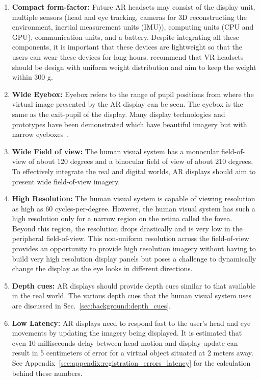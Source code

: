 \begin{enumerate}
    \item \textbf{Compact form-factor:} Future AR headsets may consist of the display unit, multiple sensors (head and eye tracking, cameras for 3D reconstructing the environment, inertial measurement units (IMU)), computing units (CPU and GPU), communication units, and a battery. Despite integrating all these components, it is important that these devices are lightweight so that the users can wear these devices for long hours. \cite{yan2018effects} recommend that VR headsets should be design with uniform weight distribution and aim to keep the weight within 300 g.
    \item \textbf{Wide Eyebox:} Eyebox refers to the range of pupil positions from where the virtual image presented by the AR display can be seen. The eyebox is the same as the exit-pupil of the display. Many display technologies and prototypes have been demonstrated which have beautiful imagery but with narrow eyeboxes~\cite{Maimone2017Holographic}. 
    \item \textbf{Wide Field of view:} The human visual system has a monocular field-of-view of about 120 degrees and a binocular field of view of about 210 degrees. To effectively integrate the real and digital worlds, AR displays should aim to present wide field-of-view imagery.
    \item \textbf{High Resolution:} The human visual system is capable of viewing resolution as high as 60 cycles-per-degree. However, the human visual system has such a high resolution only for a narrow region on the retina called the fovea. Beyond this region, the resolution drops drastically and is very low in the peripheral field-of-view. This non-uniform resolution across the field-of-view provides an opportunity to provide high resolution imagery without having to build very high resolution display panels but poses a challenge to dynamically change the display as the eye looks in different directions.
    \item \textbf{Depth cues:} AR displays should provide depth cues similar to that available in the real world. The various depth cues that the human visual system uses are discussed in Sec.~\ref{sec:background:depth_cues}. 
    \item \textbf{Low Latency:} AR displays need to respond fast to the user’s head and eye movements by updating the imagery being displayed. It is estimated that even 10 milliseconds delay between head motion and display update can result in 5 centimeters of error for a virtual object situated at 2 meters away. See Appendix~\ref{sec:appendix:registration_errors_latency} for the calculation behind these numbers.
\end{enumerate}

